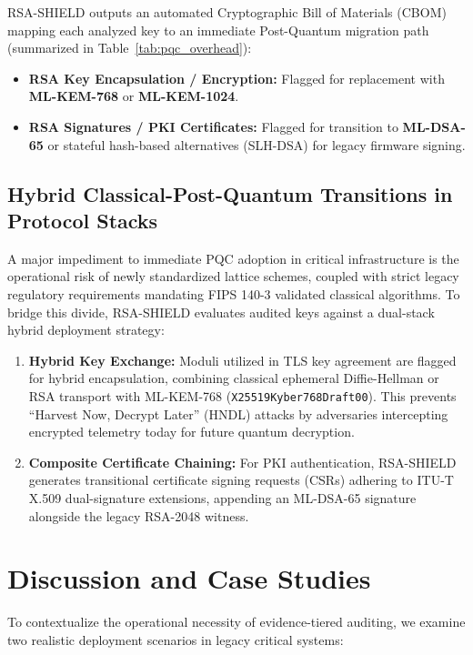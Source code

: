 \documentclass[sigconf,nonacm]{acmart}
\begin{document}
RSA-SHIELD outputs an automated Cryptographic Bill of Materials (CBOM) mapping each analyzed key to an immediate Post-Quantum migration path (summarized in Table~\ref{tab:pqc_overhead}):
\begin{itemize}
    \item \textbf{RSA Key Encapsulation / Encryption:} Flagged for replacement with \textbf{ML-KEM-768} or \textbf{ML-KEM-1024}.
    \item \textbf{RSA Signatures / PKI Certificates:} Flagged for transition to \textbf{ML-DSA-65} or stateful hash-based alternatives (SLH-DSA) for legacy firmware signing.
\end{itemize}

\subsection{Hybrid Classical-Post-Quantum Transitions in Protocol Stacks}
A major impediment to immediate PQC adoption in critical infrastructure is the operational risk of newly standardized lattice schemes, coupled with strict legacy regulatory requirements mandating FIPS 140-3 validated classical algorithms. To bridge this divide, RSA-SHIELD evaluates audited keys against a dual-stack hybrid deployment strategy:
\begin{enumerate}
    \item \textbf{Hybrid Key Exchange:} Moduli utilized in TLS key agreement are flagged for hybrid encapsulation, combining classical ephemeral Diffie-Hellman or RSA transport with ML-KEM-768 (\texttt{X25519Kyber768Draft00}). This prevents ``Harvest Now, Decrypt Later'' (HNDL) attacks by adversaries intercepting encrypted telemetry today for future quantum decryption.
    \item \textbf{Composite Certificate Chaining:} For PKI authentication, RSA-SHIELD generates transitional certificate signing requests (CSRs) adhering to ITU-T X.509 dual-signature extensions, appending an ML-DSA-65 signature alongside the legacy RSA-2048 witness.
\end{enumerate}

\section{Discussion and Case Studies}
To contextualize the operational necessity of evidence-tiered auditing, we examine two realistic deployment scenarios in legacy critical systems:
\end{document}

